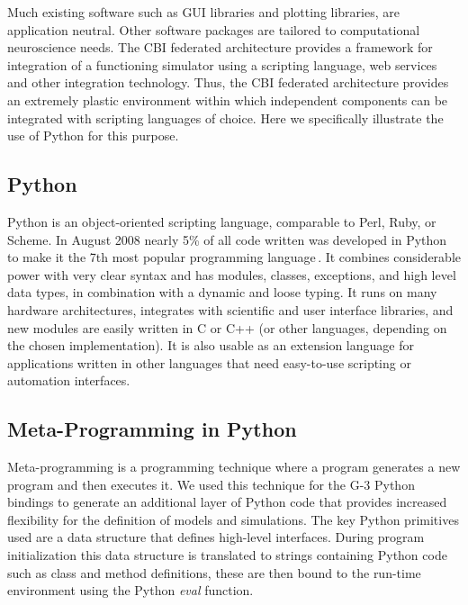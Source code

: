 \documentclass[12pt]{article}
\begin{document}
Much existing software such as GUI libraries and plotting
libraries, are application neutral.  Other software packages are
tailored to computational neuroscience needs.  The CBI federated
architecture provides a framework for integration of a functioning
simulator using a scripting language, web services and other
integration technology.  Thus, the CBI federated architecture provides
an extremely plastic environment within which independent components can
be integrated with scripting languages of choice.  Here we
specifically illustrate the use of Python for this purpose.

\subsection{Python}

Python is an object-oriented scripting language, comparable to Perl,
Ruby, or Scheme.  In August 2008 nearly 5\% of all code written was
developed in Python to make it the 7th most popular programming
language\,\cite{software09:_tiobe_progr_commun_index}. It combines
considerable power with very clear syntax and has modules, classes,
exceptions, and high level data types, in combination with a dynamic
and loose typing. It runs on many hardware architectures, integrates
with scientific and user interface libraries, and new modules are
easily written in C or C++ (or other languages, depending on the
chosen implementation). It is also usable as an extension language for
applications written in other languages that need easy-to-use
scripting or automation interfaces.


\subsection{Meta-Programming in Python}

Meta-programming is a programming technique where a program generates
a new program and then executes it.  We used this technique for the G-3
Python bindings to generate an additional layer of Python code that
provides increased flexibility for the definition of models and
simulations.  The key Python primitives used are a data structure that
defines high-level interfaces.  During program initialization this
data structure is translated to strings containing Python code such as
class and method definitions, these are then bound to the run-time
environment using the Python {\it eval} function.
\end{document}
